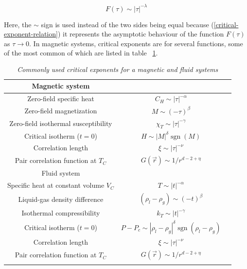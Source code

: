 \documentclass[12pt,openright,twoside]{book}
\DeclareMathOperator{\sgn}{sgn}
\begin{document}
\begin{equation}
F(\tau)\sim |\tau|^{-\lambda}
\label{critical-exponent-relation}
\end{equation}

\vspace{14pt}

Here, the $\sim$ sign is used instead of the two sides being equal because (\ref{critical-exponent-relation}) it represents the asymptotic behaviour of the function $F(\tau)$ as $\tau \to 0$. In magnetic systems, critical exponents are for several functions, some of the most common of which are listed in table ~\ref{magnetic-functions}.\\

\begin{table}[!ht]
\centering
\begin{small}
\caption{\textit{Commonly used critical exponents for a magnetic and fluid systems}}
\begin{tabular}{ccc}

\hline \hline
Magnetic system\\
\hline
Zero-field specific heat             & $C_H\sim|\tau|^{-\alpha}$   \\
Zero-field magnetization             & $M\sim(-\tau)^{\beta}$ \\
Zero-field isothermal susceptibility & $\chi_T\sim|\tau|^{-\gamma}$\\
Critical isotherm ($t=0$)            & $H\sim|M|^{\delta}\sgn (M)$ \\
Correlation length                   & $\xi\sim|\tau|^{-\nu}$ \\
Pair correlation function at $T_C$   & $G(\Vec{r})\sim 1/r^{d-2+\eta}$ \\
\hline
Fluid system\\
\hline
Specific heat at constant volume $V_C$& $T\sim |t|^{-\alpha}$\\
Liquid-gas density difference & $(\rho_l-\rho_g)\sim(-t)^\beta$\\
Isothermal compressibility & $k_T\sim|t|^{-\gamma}$\\
Critical isotherm ($t=0$) & $P-P_c\sim|\rho_l-\rho_g|^\delta\sgn(\rho_l-\rho_g)$\\
Correlation length & $\xi\sim|\tau|^{-\nu}$\\
Pair correlation function at $T_C$   & $G(\Vec{r})\sim 1/r^{d-2+\eta}$ \\
\hline
\label{magnetic-functions}
\end{tabular}
\end{small}
\end{table}
\end{document}
